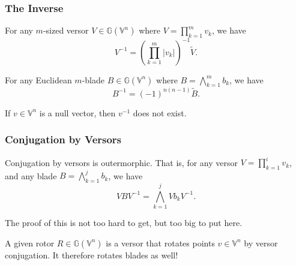 \documentclass{beamer}
\newcommand{\G}{\mathbb{G}}
\newcommand{\V}{\mathbb{V}}
\begin{document}
\begin{frame}
\frametitle{The Inverse}
\begin{lemma}
For any $m$-sized versor $V\in\G(\V^n)$ where $V=\prod_{k=1}^m v_k$, we have
\begin{equation*}
V^{-1} = \left(\prod_{k=1}^m |v_k|\right)^{-1}\tilde{V}.
\end{equation*}
\end{lemma}
\begin{lemma}
For any \alert{Euclidean} $m$-blade $B\in\G(\V^n)$ where $B=\bigwedge_{k=1}^m b_k$, we have
\begin{equation*}
B^{-1} = (-1)^{n(n-1)}\tilde{B}.
\end{equation*}
\end{lemma}
\begin{example}
If $v\in\V^n$ is a null vector, then $v^{-1}$ does not exist.
\end{example}
\end{frame}

\begin{frame}
\frametitle{Conjugation by Versors}
\begin{lemma}
Conjugation by versors is outermorphic.  That is, for any versor $V=\prod_{k=1}^i v_k$,
and any blade $B=\bigwedge_{k=1}^j b_k$, we have
\begin{equation*}
VBV^{-1} = \bigwedge_{k=1}^j Vb_kV^{-1}.
\end{equation*}
\end{lemma}
The proof of this is not too hard to get, but too big to put here.
\begin{example}
A given rotor $R\in\G(\V^n)$ is a versor that rotates points $v\in\V^n$
by versor conjugation.  It therefore rotates blades as well!
\end{example}
\end{frame}

\end{document}
